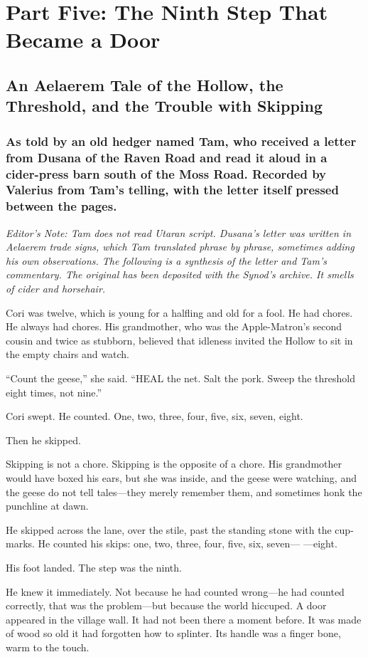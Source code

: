 \documentclass[12pt]{article}
\begin{document}
\section{Part Five: The Ninth Step That Became a Door}
\subsection{An Aelaerem Tale of the Hollow, the Threshold, and the Trouble with Skipping}
\subsubsection{As told by an old hedger named Tam, who received a letter from Dusana of the Raven Road and read it aloud in a cider-press barn south of the Moss Road. Recorded by Valerius from Tam's telling, with the letter itself pressed between the pages.}
\textit{Editor's Note: Tam does not read Utaran script. Dusana's letter was written in Aelaerem trade signs, which Tam translated phrase by phrase, sometimes adding his own observations. The following is a synthesis of the letter and Tam's commentary. The original has been deposited with the Synod's archive. It smells of cider and horsehair.}

Cori was twelve, which is young for a halfling and old for a fool. He had chores. He always had chores. His grandmother, who was the Apple-Matron's second cousin and twice as stubborn, believed that idleness invited the Hollow to sit in the empty chairs and watch.

``Count the geese,'' she said. ``HEAL the net. Salt the pork. Sweep the threshold eight times, not nine.''

Cori swept. He counted. One, two, three, four, five, six, seven, eight.

Then he skipped.

Skipping is not a chore. Skipping is the opposite of a chore. His grandmother would have boxed his ears, but she was inside, and the geese were watching, and the geese do not tell tales---they merely remember them, and sometimes honk the punchline at dawn.

He skipped across the lane, over the stile, past the standing stone with the cup-marks. He counted his skips: one, two, three, four, five, six, seven--- ---eight.

His foot landed. The step was the ninth.

He knew it immediately. Not because he had counted wrong---he had counted correctly, that was the problem---but because the world hiccuped. A door appeared in the village wall. It had not been there a moment before. It was made of wood so old it had forgotten how to splinter. Its handle was a finger bone, warm to the touch.
\end{document}
